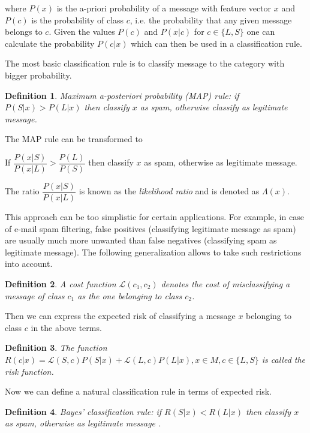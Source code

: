 \documentclass[12pt]{report}
\newcommand{\Loss}{\mathcal{L}}
\newtheorem{definition}{Definition}[section]
\begin{document}
where $P(x)$ is the a-priori probability of a message with feature vector $x$ and $P(c)$ is the probability of class $c$, i.e. the probability that any given message belongs to $c$. Given the values $P(c)$ and $P(x | c)$ for $c \in \{L, S\}$ one can calculate the probability $P(c | x)$ which can then be used in a classification rule.

The most basic classification rule is to classify message to the category with bigger probability.

\begin{definition}
	Maximum a-posteriori probability (MAP) rule: if $P(S | x) > P(L | x)$ then classify $x$ as spam, otherwise classify as legitimate message.
\end{definition}

The MAP rule can be transformed to

\begin{center}
	If $\dfrac{P(x | S)}{P(x | L)} > \dfrac{P(L)}{P(S)}$ then classify $x$ as spam, otherwise as legitimate message.
\end{center}

The ratio $\dfrac{P(x | S)}{P(x | L)}$ is known as the \textit{likelihood ratio} and is denoted as $\Lambda(x)$.

This approach can be too simplistic for certain applications. For example, in case of e-mail spam filtering, false positives (classifying legitimate message as spam) are usually much more unwanted than false negatives (classifying spam as legitimate message). The following generalization allows to take such restrictions into account.

\begin{definition}
	A cost function $\Loss(c_1, c_2)$ denotes the cost of misclassifying a message of class $c_1$ as the one belonging to class $c_2$.
\end{definition}

Then we can express the expected risk of classifying a message $x$ belonging to class $c$ in the above terms.

\begin{definition}
	The function $R(c | x) = \Loss(S, c) P(S |x) + \Loss(L, c) P(L | x), x \in M, c \in \{L, S\}$ is called the risk function.
\end{definition}

Now we can define a natural classification rule in terms of expected risk.

\begin{definition}
	Bayes' classification rule: if $R(S | x) < R(L | x)$ then classify $x$ as spam, otherwise as legitimate message \cite{Kecman}.
\end{definition}
\end{document}
